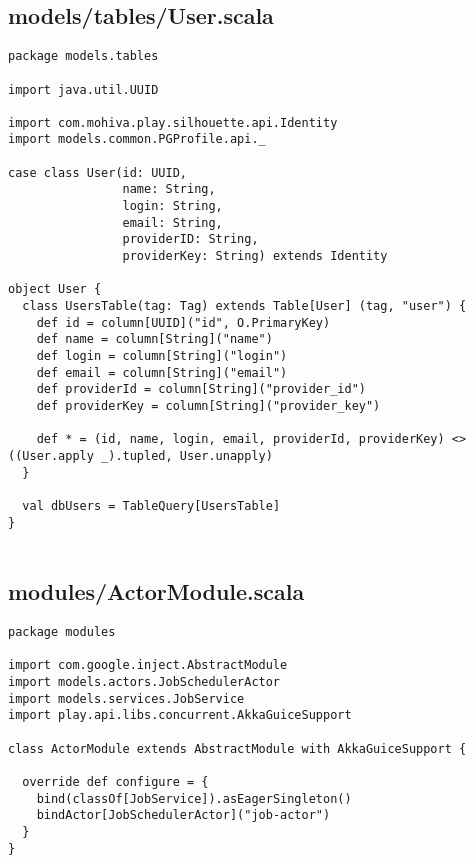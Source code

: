 \subsection{models/tables/User.scala}
\begin{lstlisting}
package models.tables

import java.util.UUID

import com.mohiva.play.silhouette.api.Identity
import models.common.PGProfile.api._

case class User(id: UUID,
                name: String,
                login: String,
                email: String,
                providerID: String,
                providerKey: String) extends Identity

object User {
  class UsersTable(tag: Tag) extends Table[User] (tag, "user") {
    def id = column[UUID]("id", O.PrimaryKey)
    def name = column[String]("name")
    def login = column[String]("login")
    def email = column[String]("email")
    def providerId = column[String]("provider_id")
    def providerKey = column[String]("provider_key")

    def * = (id, name, login, email, providerId, providerKey) <> ((User.apply _).tupled, User.unapply)
  }

  val dbUsers = TableQuery[UsersTable]
}


\end{lstlisting}
\subsection{modules/ActorModule.scala}
\begin{lstlisting}
package modules

import com.google.inject.AbstractModule
import models.actors.JobSchedulerActor
import models.services.JobService
import play.api.libs.concurrent.AkkaGuiceSupport

class ActorModule extends AbstractModule with AkkaGuiceSupport {

  override def configure = {
    bind(classOf[JobService]).asEagerSingleton()
    bindActor[JobSchedulerActor]("job-actor")
  }
}
\end{lstlisting}
